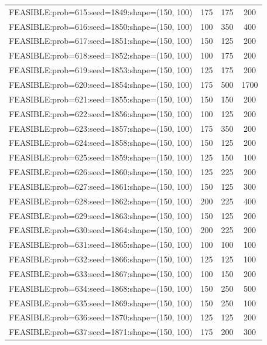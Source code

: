 \begin{longtable}{lccc}
FEASIBLE:prob=615:seed=1849:shape=(150, 100) &      175 &   175 &    200 \\
FEASIBLE:prob=616:seed=1850:shape=(150, 100) &      100 &   350 &    400 \\
FEASIBLE:prob=617:seed=1851:shape=(150, 100) &      150 &   125 &    200 \\
FEASIBLE:prob=618:seed=1852:shape=(150, 100) &      100 &   175 &    200 \\
FEASIBLE:prob=619:seed=1853:shape=(150, 100) &      125 &   175 &    200 \\
FEASIBLE:prob=620:seed=1854:shape=(150, 100) &      175 &   500 &   1700 \\
FEASIBLE:prob=621:seed=1855:shape=(150, 100) &      150 &   150 &    200 \\
FEASIBLE:prob=622:seed=1856:shape=(150, 100) &      100 &   125 &    200 \\
FEASIBLE:prob=623:seed=1857:shape=(150, 100) &      175 &   350 &    200 \\
FEASIBLE:prob=624:seed=1858:shape=(150, 100) &      150 &   125 &    200 \\
FEASIBLE:prob=625:seed=1859:shape=(150, 100) &      125 &   150 &    100 \\
FEASIBLE:prob=626:seed=1860:shape=(150, 100) &      125 &   225 &    200 \\
FEASIBLE:prob=627:seed=1861:shape=(150, 100) &      150 &   125 &    300 \\
FEASIBLE:prob=628:seed=1862:shape=(150, 100) &      200 &   225 &    400 \\
FEASIBLE:prob=629:seed=1863:shape=(150, 100) &      150 &   125 &    200 \\
FEASIBLE:prob=630:seed=1864:shape=(150, 100) &      200 &   225 &    200 \\
FEASIBLE:prob=631:seed=1865:shape=(150, 100) &      100 &   100 &    100 \\
FEASIBLE:prob=632:seed=1866:shape=(150, 100) &      125 &   125 &    100 \\
FEASIBLE:prob=633:seed=1867:shape=(150, 100) &      100 &   150 &    200 \\
FEASIBLE:prob=634:seed=1868:shape=(150, 100) &      150 &   250 &    500 \\
FEASIBLE:prob=635:seed=1869:shape=(150, 100) &      150 &   250 &    100 \\
FEASIBLE:prob=636:seed=1870:shape=(150, 100) &      125 &   125 &    200 \\
FEASIBLE:prob=637:seed=1871:shape=(150, 100) &      175 &   200 &    300 \\

\end{longtable}
